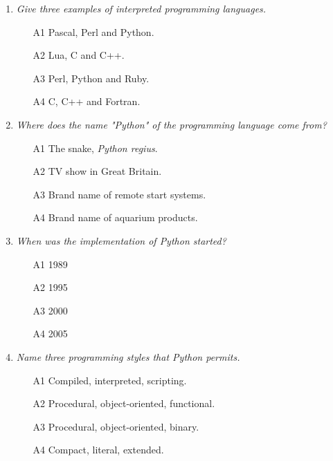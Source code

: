 \begin{enumerate}
\item {\em Give three examples of interpreted programming languages.}\\

\begin{enumerate}
\item[A1] Pascal, Perl and Python.
\item[A2] Lua, C and C++.
\item[A3] Perl, Python and Ruby. 
\item[A4] C, C++ and Fortran.
\end{enumerate}
\vspace{4mm}

\item {\em Where does the name "Python" of the programming language come from?}\\

\begin{enumerate}
\item[A1] The snake, {\em Python regius}.
\item[A2] TV show in Great Britain.
\item[A3] Brand name of remote start systems.
\item[A4] Brand name of aquarium products.
\end{enumerate}
\vspace{4mm}

\item {\em When was the implementation of Python started?}\\

\begin{enumerate}
\item[A1] 1989
\item[A2] 1995
\item[A3] 2000
\item[A4] 2005
\end{enumerate}
\vspace{4mm}

\item {\em Name three programming styles that Python permits.}\\

\begin{enumerate}
\item[A1] Compiled, interpreted, scripting.
\item[A2] Procedural, object-oriented, functional.
\item[A3] Procedural, object-oriented, binary.
\item[A4] Compact, literal, extended.
\end{enumerate}
\vspace{4mm}


\end{enumerate}
